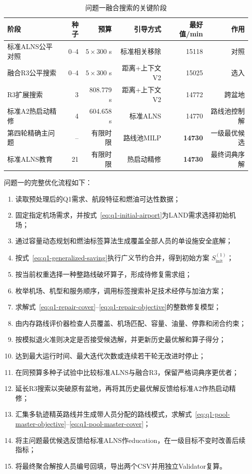 \documentclass[UTF8,a4paper,zihao=5]{ctexart}
\begin{document}
\begin{table}[htbp]
  \centering
  \caption{问题一融合搜索的关键阶段}
  \label{tab:q1-alns-parameters}
  \begin{tabular}{lrrrrr}
    \toprule
    阶段 & 种子 & 预算 & 引导方式 & 最好值/min & 作用\\
    \midrule
    标准ALNS公平对照 & 0--4 & $5\times300$ s & 标准相关移除 & 15118 & 对照\\
    融合R3公平搜索 & 0--4 & $5\times300$ s & 距离+上下文V2 & 15025 & 选入\\
    R3扩展搜索 & 3 & 808.779 s & 距离+上下文V2 & 14772 & 跨盆地\\
    标准A2热启动精修 & 4 & 604.658 s & 标准ALNS & 14770 & 路线池控制解\\
    第四轮精确主问题 & -- & 有限时限 & 路线池MILP & \textbf{14730} & 一级最优候选\\
    标准ALNS教育 & 21 & 有限时限 & 热启动精修 & \textbf{14730} & 最终词典序解\\
    \bottomrule
  \end{tabular}
\end{table}

问题一的完整优化流程如下：
\begin{enumerate}[label=\textbf{步骤\arabic*.},leftmargin=4.5em]
  \item 读取预处理后的Q1需求、航段特征和燃油可达性数据；
  \item 固定指定机场需求，并按式~\eqref{eq:q1-initial-airport}为LAND需求选择初始机场；
  \item 通过容量动态规划和燃油标签算法生成覆盖全部人员的单设施安全底解；
  \item 按式~\eqref{eq:q1-generalized-saving}执行广义节约合并，得到初始方案
  $S_{\mathrm{init}}^{(1)}$；
  \item 按当前权重选择一种整路线破坏算子，形成待修复需求组；
  \item 枚举机场、机型和服务顺序，调用标签搜索补足技术经停与加油方案；
  \item 求解式~\eqref{eq:q1-repair-cover}--\eqref{eq:q1-repair-objective}的整数修复模型；
  \item 由内存路线评价器检查人员覆盖、机场匹配、容量、油量、停靠和闭合约束；
  \item 按模拟退火准则决定是否接受候选解，并更新历史最优解和算子得分；
  \item 达到最大运行时间、最大迭代次数或连续若干轮无改进时停止；
  \item 在同预算多种子试验中比较标准ALNS与融合R3，保留严格词典序更优者；
  \item 延长R3搜索以突破原有盆地，再将其历史最优解反馈给标准A2作热启动精修；
  \item 汇集多轨迹精英路线并生成带人员分配的路线模式，求解式~\eqref{eq:q1-pool-master-objective}--\eqref{eq:q1-pool-master-cover}；
  \item 将主问题最优候选反馈给标准ALNS作education，在一级目标不变时改善后续指标；
  \item 将最终聚合解按人员编号回填，导出两个CSV并用独立Validator复算。
\end{enumerate}
\end{document}
